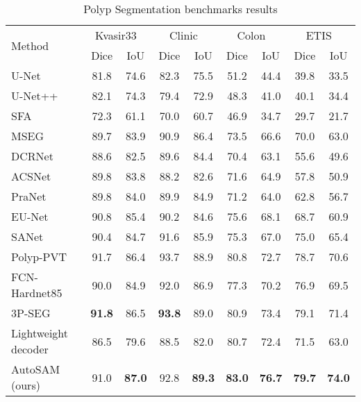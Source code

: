 \documentclass[runningheads]{llncs}
\begin{document}
\begin{table}[t]
\begin{center}
    \begin{tabular}{@{}l@{~}cccccccc@{}}
    \toprule
    \multirow{2}{*}{Method}&\multicolumn{2}{c}{Kvasir33~\cite{jha2020kvasir}}&\multicolumn{2}{c}{Clinic~\cite{bernal2015wm}}&\multicolumn{2}{c}{Colon~\cite{tajbakhsh2015automated}}&\multicolumn{2}{c}{ETIS~\cite{silva2014toward}}\\ \cmidrule(l){2-9} 
     & Dice & IoU &  Dice & IoU  & Dice & IoU &  Dice & IoU \\
    \midrule
    U-Net~\cite{ronneberger2015u} & 81.8 & 74.6 & 82.3 & 75.5 & 51.2 & 44.4 & 39.8 & 33.5\\
    U-Net++~\cite{zhou2018unet++} & 82.1 & 74.3 & 79.4 & 72.9 & 48.3 & 41.0 & 40.1 & 34.4\\
    SFA~\cite{fang2019selective} & 72.3 & 61.1 & 70.0 & 60.7 & 46.9 & 34.7 & 29.7 & 21.7\\
    MSEG~\cite{huang2021hardnet} & 89.7 & 83.9 & 90.9 & 86.4 & 73.5 & 66.6 & 70.0 & 63.0\\
    DCRNet~\cite{yin2021duplex} & 88.6 & 82.5 & 89.6 & 84.4 & 70.4 & 63.1 & 55.6 & 49.6\\
    ACSNet~\cite{zhang2020adaptive} & 89.8 & 83.8 & 88.2 & 82.6 & 71.6 & 64.9 & 57.8 & 50.9\\
    PraNet~\cite{fan2020pranet} & 89.8 & 84.0 & 89.9 & 84.9 & 71.2 & 64.0 & 62.8 & 56.7\\
    EU-Net~\cite{patel2021enhanced} & 90.8 & 85.4 & 90.2 & 84.6 & 75.6 & 68.1 & 68.7 & 60.9\\
    SANet~\cite{wei2021shallow} & 90.4 & 84.7 & 91.6 & 85.9 & 75.3 & 67.0 & 75.0 & 65.4\\
    Polyp-PVT~\cite{dong2021polyp} & 91.7 & 86.4 & 93.7 & 88.9 & 80.8 & 72.7 & 78.7 & 70.6\\
    FCN-Hardnet85~\cite{chao2019hardnet} & 90.0 & 84.9 & 92.0 & 86.9 & 77.3 & 70.2 & 76.9 & 69.5\\
    3P-SEG~\cite{shaharabany2022end} & \textbf{91.8} & {86.5} & \textbf{93.8} & {89.0} & {80.9} & {73.4} & {79.1} & {71.4}\\
    \midrule
    Lightweight decoder  & 86.5 & 79.6 & 88.5 & 82.0 & 80.7 & 72.4 & 71.5 & 63.0\\
    AutoSAM (ours) & {91.0} & \textbf{87.0} & {92.8} & \textbf{89.3} & \textbf{83.0} & \textbf{76.7} & \textbf{79.7} & \textbf{74.0}\\
    \bottomrule
    \end{tabular}
\end{center}
    \caption{Polyp Segmentation benchmarks results}
    \label{tab:polyp}
\end{table}
\end{document}
